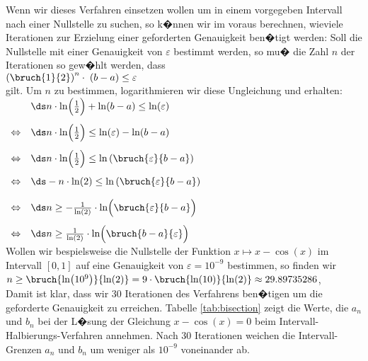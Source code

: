 Wenn wir dieses Verfahren einsetzen
wollen um in einem vorgegeben Intervall nach einer Nullstelle zu suchen, so k�nnen wir im
voraus berechnen, wieviele Iterationen zur Erzielung einer geforderten Genauigkeit
ben�tigt werden:  Soll die Nullstelle mit einer Genauigkeit von $\varepsilon$ bestimmt
werden, so mu� die Zahl $n$ der Iterationen so gew�hlt werden, dass 
\\[0.2cm]
\hspace*{1.3cm}
$\left(\bruch{1}{2}\right)^n \cdot \;(b - a) \leq \varepsilon$
\\[0.2cm]
gilt.  Um $n$ zu bestimmen, logarithmieren wir diese Ungleichung und erhalten:
\\[0.2cm]
\hspace*{1.3cm}
$
\begin{array}[t]{ll} 
                &\ds n \cdot \ln\Bigl(\frac{1}{2}\Bigr) + \ln(b - a) \leq \ln(\varepsilon) \\[0.4cm]
\Leftrightarrow &\ds n \cdot \ln\Bigl(\frac{1}{2}\Bigr) \leq \ln(\varepsilon) - \ln(b - a) \\[0.4cm]
\Leftrightarrow &\ds n \cdot \ln\Bigl(\frac{1}{2}\Bigr) \leq \ln\left(\bruch{\varepsilon}{b - a}\right) \\[0.4cm]
\Leftrightarrow &\ds - n \cdot \ln(2) \leq \ln\left(\bruch{\varepsilon}{b - a}\right) \\[0.4cm]
\Leftrightarrow &\ds n \geq - \frac{1}{\ln(2)} \cdot \ln\Bigl(\bruch{\varepsilon}{b - a}\Bigr) \\[0.4cm]
\Leftrightarrow &\ds n \geq \frac{1}{\ln(2)} \cdot \ln\Bigl(\bruch{b - a}{\varepsilon}\Bigr)
\end{array}
$
\\[0.4cm]
Wollen wir bespielsweise die Nullstelle der Funktion $x \mapsto x - \cos(x)$ im Intervall
$[0,1]$ auf eine Genauigkeit von $\varepsilon = 10^{-9}$ bestimmen, so finden wir
\\[0.2cm]
\hspace*{1.3cm}
$n \geq \bruch{\ln\bigl(10^{9}\bigr)}{\ln(2)} = 9 \cdot \bruch{\ln(10)}{\ln(2)} \approx 29.89735286$,
\\[0.2cm]
Damit ist klar, dass wir 30 Iterationen des Verfahrens ben�tigen um die geforderte
Genauigkeit zu erreichen.  Tabelle \ref{tab:bisection} zeigt die Werte, die $a_n$ und
$b_n$ bei der L�sung der Gleichung $x - \cos(x) = 0$ beim Intervall-Halbierungs-Verfahren
annehmen. Nach 30 Iterationen weichen die Intervall-Grenzen $a_n$ und $b_n$ um weniger als
$10^{-9}$ voneinander ab.

